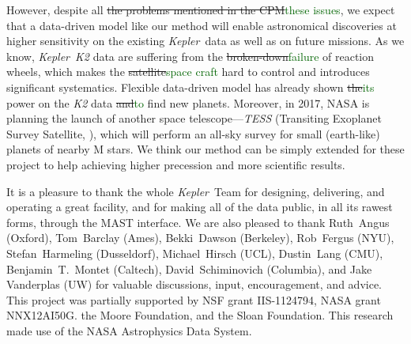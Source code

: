 \documentclass[12pt, preprint]{aastex}
\newcommand{\project}[1]{\textsl{#1}}
\newcommand{\Kepler}{\project{Kepler}}
\newcommand{\name}{CPM}
\newcommand{\revise}[1]{\textcolor{darkgreen}{#1}}
\newcommand{\remove}[1]{\sout{#1}}
\begin{document}
However, despite all \remove{the problems mentioned in the \name}\revise{these issues}, we expect that a data-driven model like our method will enable astronomical discoveries at higher sensitivity on the existing \Kepler\ data as well as on future missions.  
As we know, \Kepler\ \project{K2} \citep{k2} data are suffering from the \remove{broken-down}\revise{failure} of reaction wheels,  which makes the \remove{satellite}\revise{space craft} hard to control and introduces significant systematics. 
Flexible data-driven model \citep{dfm} has already shown \remove{the}\revise{its} power on the \project{K2} data \remove{and}\revise{to} find new planets.
Moreover, in 2017, NASA is planning the launch of another space telescope---\project{TESS} (Transiting Exoplanet Survey Satellite, \citealt{tess}), 
  which will perform an all-sky survey for small (earth-like) planets of nearby M stars. 
  We think our method can be simply extended for these project to help achieving higher precession and more scientific results. 


\acknowledgements
It is a pleasure to thank the whole \Kepler\ Team
  for designing, delivering, and operating a great facility,
  and for making all of the data public, in all its rawest forms, through the MAST interface.
We are also pleased to thank
  Ruth~Angus (Oxford),
  Tom~Barclay (Ames),
  Bekki~Dawson (Berkeley),
  Rob~Fergus (NYU),
  Stefan~Harmeling (Dusseldorf),
  Michael~Hirsch (UCL),
  Dustin~Lang (CMU),
  Benjamin~T.~Montet (Caltech),
  David~Schiminovich (Columbia),
  and
  Jake Vanderplas (UW)
for valuable discussions, input, encouragement, and advice.
This project was partially supported by
  NSF grant IIS-1124794,
  NASA grant NNX12AI50G.
  the Moore Foundation,
  and
  the Sloan Foundation.
This research made use of the NASA Astrophysics Data System.

\clearpage

%
\clearpage
\end{document}
